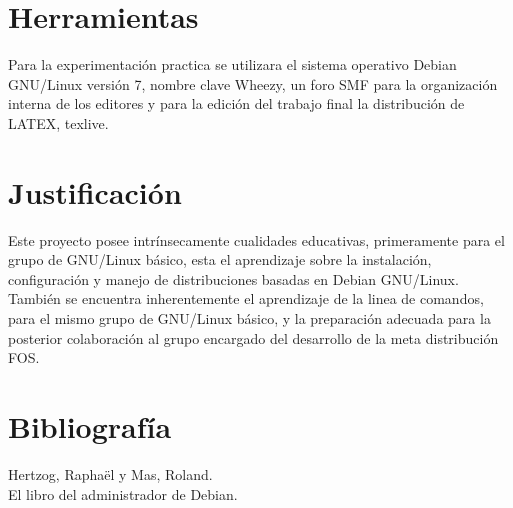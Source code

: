 \documentclass[letterpaper,11pt]{article}
\begin{document}
\section{Herramientas}
Para la experimentación practica se utilizara el sistema operativo Debian GNU/Linux versión 7, nombre clave Wheezy, un foro SMF para la organización interna de los editores y para la edición del trabajo final la distribución de LATEX, texlive.

\section{Justificación}
Este proyecto posee intrínsecamente cualidades educativas, primeramente para el grupo de GNU/Linux básico, esta el aprendizaje sobre la instalación, configuración y manejo de distribuciones basadas en Debian GNU/Linux.\\
También se encuentra inherentemente el aprendizaje de la linea de comandos, para el mismo grupo de GNU/Linux básico, y la preparación adecuada para la posterior colaboración al grupo encargado del desarrollo de la meta distribución FOS.

\section{Bibliografía}
\begin{flushleft}
Hertzog,  Raphaël  y Mas, Roland.\\
El libro del administrador de Debian.\\
\end{flushleft}
\end{document}
